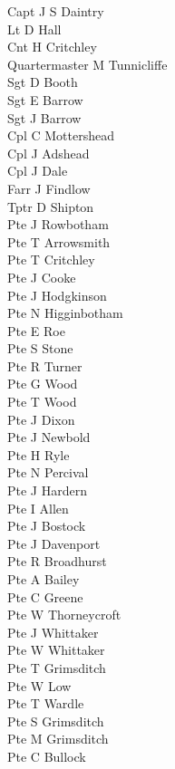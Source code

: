 \begin{multicols}{2}
  \noindent
  Capt J S Daintry \\
  Lt D Hall \\
  Cnt H Critchley \\
  Quartermaster M Tunnicliffe \\
  Sgt D Booth \\
  Sgt E Barrow \\
  Sgt J Barrow \\
  Cpl C Mottershead \\
  Cpl J Adshead \\
  Cpl J Dale \\
  Farr J Findlow \\
  Tptr D Shipton \\
  Pte J Rowbotham \\
  Pte T Arrowsmith \\
  Pte T Critchley \\
  Pte J Cooke \\
  Pte J Hodgkinson \\
  Pte N Higginbotham \\
  Pte E Roe \\
  Pte S Stone \\
  Pte R Turner \\
  Pte G Wood \\
  Pte T Wood \\
  Pte J Dixon \\
  Pte J Newbold \\
  Pte H Ryle \\
  Pte N Percival \\
  Pte J Hardern \\
  Pte I Allen \\
  Pte J Bostock \\
  Pte J Davenport \\
  Pte R Broadhurst \\
  Pte A Bailey \\
  Pte C Greene \\
  Pte W Thorneycroft \\
  Pte J Whittaker \\
  Pte W Whittaker \\
  Pte T Grimsditch \\
  Pte W Low \\
  Pte T Wardle \\
  Pte S Grimsditch \\
  Pte M Grimsditch \\
  Pte C Bullock \\

\end{multicols}
